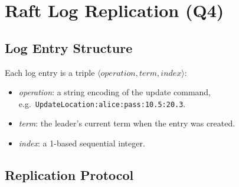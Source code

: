 \documentclass[11pt]{article}
\begin{document}
\section{Raft Log Replication (Q4)}

\subsection{Log Entry Structure}

Each log entry is a triple $\langle \textit{operation}, \textit{term}, \textit{index} \rangle$:
\begin{itemize}
  \item \textit{operation}: a string encoding of the update command,
    e.g.\ \lstinline|UpdateLocation:alice:pass:10.5:20.3|.
  \item \textit{term}: the leader's current term when the entry was created.
  \item \textit{index}: a 1-based sequential integer.
\end{itemize}

\subsection{Replication Protocol}
\end{document}

